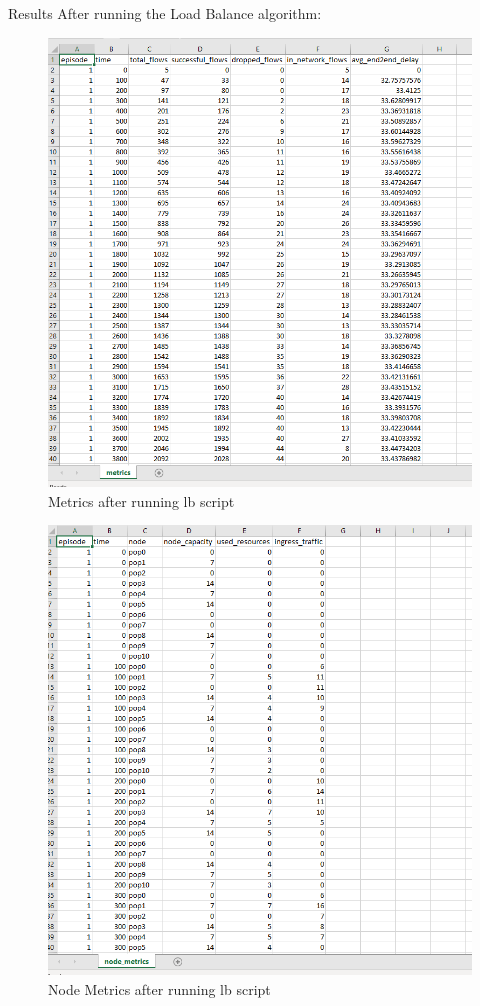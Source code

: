 Results After running the Load Balance algorithm:

\begin{figure}[h]
    \centering
    \includegraphics[width=1\textwidth]{lbmetrics}
    \caption{Metrics after running lb script}
    \label{fig:lbmetrics}
\end{figure}


\begin{figure}[h]
    \centering
    \includegraphics[width=1\textwidth]{lbnodemetrics}
    \caption{Node Metrics after running lb script}
    \label{fig:lbnodemetrics}
\end{figure}


